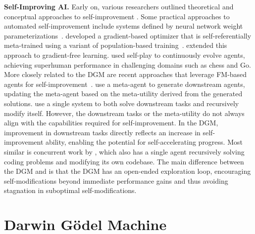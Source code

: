 \documentclass{article}
\begin{document}
\textbf{Self-Improving AI.}
Early on, various researchers outlined theoretical and conceptual approaches to self-improvement \citep{good1966speculations, schmidhuber1987evolutionary, schmidhuber2007godel}. Some practical approaches to automated self-improvement include systems defined by neural network weight parameterizations~\citep{hall2007self, hobbhahn2025swebenchmini, kirsch2022self, lu2023arbitrary, havrilla2024glore}. \citet{metz2021training} developed a gradient-based optimizer that is self-referentially meta-trained using a variant of population-based training~\citep{jaderberg2017population}. \citet{lange2023discovering} extended this approach to gradient-free learning. \citet{silver2017mastering} used self-play to continuously evolve agents, achieving superhuman performance in challenging domains such as chess and Go. More closely related to the DGM are recent approaches that leverage FM-based agents for self-improvement~\citep{yin2024g, robeyns2025self, hu2024self, zelikman2024self, huang2022large, singh2023beyond}. \citet{zelikman2024self} use a meta-agent to generate downstream agents, updating the meta-agent based on the meta-utility derived from the generated solutions. \citet{yin2024g} use a single system to both solve downstream tasks and recursively modify itself. However, the downstream tasks or the meta-utility do not always align with the capabilities required for self-improvement. In the DGM, improvement in downstream tasks directly reflects an increase in self-improvement ability, enabling the potential for self-accelerating progress. Most similar is concurrent work by \citet{robeyns2025self}, which also has a single agent recursively solving coding problems and modifying its own codebase. The main difference between the DGM and \citet{robeyns2025self} is that the DGM has an open-ended exploration loop, encouraging self-modifications beyond immediate performance gains and thus avoiding stagnation in suboptimal self-modifications.

\vspace{-2mm}
\section{Darwin G\"odel Machine}
\label{sec:methods}
\vspace{-2mm}
\end{document}

